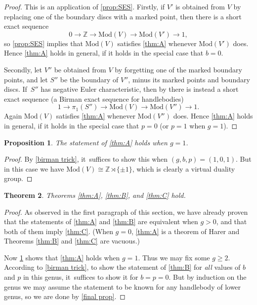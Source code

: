 \documentclass[11pt]{article}
\theoremstyle{plain}
\newtheorem{thm}{Theorem}[section]
\newtheorem{prop}[thm]{Proposition}
\theoremstyle{definition}
\newcommand{\Z}{\mathbb Z}
\newcommand{\hmod}{\mathrm{Mod}}
\begin{document}
\begin{proof}
This is an application of \cref{prop:SES}. Firstly, if $V'$ is obtained from $V$ by replacing one of the boundary discs with a marked point, then there is a short exact sequence
\[
0 \to \Z \to \hmod(V) \to \hmod(V')\to 1,
\]
so \cref{prop:SES} implies that $\hmod(V)$ satisfies \cref{thm:A} whenever $\hmod(V')$ does. Hence \cref{thm:A} holds in general, if it holds in the special case that $b=0$.

Secondly, let $V''$ be obtained from $V$ by forgetting one of the marked boundary points, and let $S''$ be the boundary of $V''$, minus its marked points and boundary discs. If~$S''$ has negative Euler characteristic, then by \cite[Lem.\,3.3]{hensel} there is instead a short exact sequence (a Birman exact sequence for handlebodies)
\[
1 \to \pi_1(S'') \to \hmod(V) \to \hmod(V'')\to 1.
\]
Again $\hmod(V)$ satisfies \cref{thm:A} whenever $\hmod(V'')$ does. Hence \cref{thm:A} holds in general, if it holds in the special case that $p=0$ (or $p=1$ when $g=1$).
\end{proof}

\begin{prop}\label{genus one}
The statement of \cref{thm:A} holds when $g=1$.
\end{prop}

\begin{proof}
By \cref{birman trick}, it~suffices to show this when $(g,b,p)=(1,0,1)$. But in this case we have $\hmod(V)\cong \Z \rtimes \{\pm 1\}$, which is clearly a virtual duality group.
\end{proof}

\begin{thm}
Theorems \ref{thm:A}, \ref{thm:B}, and \ref{thm:C} hold.
\end{thm}
\begin{proof}
As observed in the first paragraph of this section, we have already proven that the statements of \cref{thm:A} and \cref{thm:B} are equivalent when $g>0$, and that both of them imply \cref{thm:C}. (When $g=0$, \cref{thm:A} is a theorem of Harer and Theorems \ref{thm:B} and \ref{thm:C} are vacuous.)

Now \cref{genus one} shows that \cref{thm:A} holds when $g=1$. Thus we may fix some $g \geq 2$. According to \cref{birman trick}, to show the statement of \cref{thm:B} for \emph{all} values of $b$ and $p$ in this genus, it~suffices to show it for
$b=p=0$. But by induction on the genus we may assume the statement to be known for any handlebody of lower genus, so we are done by \cref{final prop}.
\end{proof}
\end{document}
